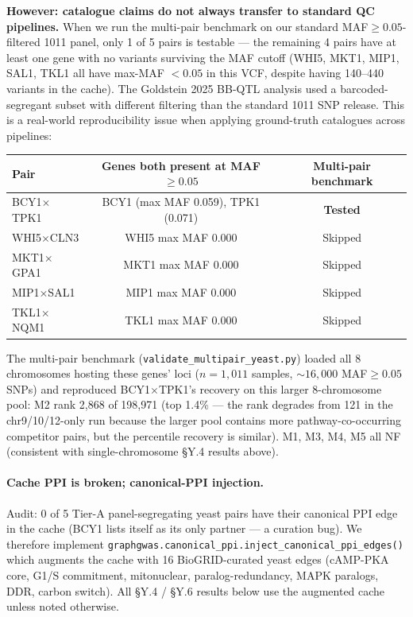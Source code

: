 \textbf{However: catalogue claims do not always transfer to standard QC
pipelines.} When we run the multi-pair benchmark on our standard
MAF$\geq 0.05$-filtered 1011 panel, only 1 of 5 pairs is testable —
the remaining 4 pairs have at least one gene with no variants surviving
the MAF cutoff (WHI5, MKT1, MIP1, SAL1, TKL1 all have max-MAF
$<0.05$ in this VCF, despite having 140--440 variants in the cache).
The Goldstein 2025 BB-QTL analysis used a barcoded-segregant subset
with different filtering than the standard 1011 SNP release. This is
a real-world reproducibility issue when applying ground-truth
catalogues across pipelines:

\begin{center}\small
\begin{tabular}{lcc}
\toprule
Pair                & Genes both present at MAF$\geq 0.05$ & Multi-pair benchmark \\
\midrule
BCY1$\times$TPK1    & BCY1 (max MAF 0.059), TPK1 (0.071) & \textbf{Tested} \\
WHI5$\times$CLN3    & WHI5 max MAF 0.000   & Skipped \\
MKT1$\times$GPA1    & MKT1 max MAF 0.000   & Skipped \\
MIP1$\times$SAL1    & MIP1 max MAF 0.000   & Skipped \\
TKL1$\times$NQM1    & TKL1 max MAF 0.000   & Skipped \\
\bottomrule
\end{tabular}
\end{center}

The multi-pair benchmark (\texttt{validate\_multipair\_yeast.py}) loaded
all 8 chromosomes hosting these genes' loci ($n=1{,}011$ samples,
$\sim 16{,}000$ MAF$\geq 0.05$ SNPs) and reproduced BCY1$\times$TPK1's
recovery on this larger 8-chromosome pool: M2 rank 2{,}868 of 198{,}971
(top 1.4\% — the rank degrades from 121 in the chr9/10/12-only run
because the larger pool contains more pathway-co-occurring competitor
pairs, but the percentile recovery is similar). M1, M3, M4, M5 all NF
(consistent with single-chromosome §Y.4 results above).

\paragraph{Cache PPI is broken; canonical-PPI injection.}
Audit: 0 of 5 Tier-A panel-segregating yeast pairs have their canonical
PPI edge in the cache (BCY1 lists itself as its only partner — a
curation bug). We therefore implement
\texttt{graphgwas.canonical\_ppi.inject\_canonical\_ppi\_edges()} which
augments the cache with 16 BioGRID-curated yeast edges (cAMP-PKA core,
G1/S commitment, mitonuclear, paralog-redundancy, MAPK paralogs, DDR,
carbon switch). All §Y.4 / §Y.6 results below use the augmented cache
unless noted otherwise.

